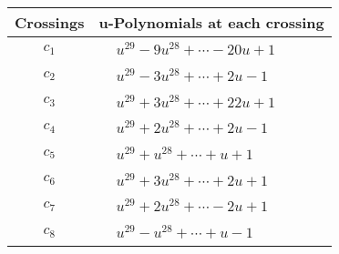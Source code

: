 \documentclass[1p]{elsarticle_modified}
\theoremstyle{definition}
\begin{document}
\begin{tabular}{m{50pt}|m{274pt}}
Crossings & \hspace{64pt}u-Polynomials at each crossing \\
\hline $$\begin{aligned}c_{1}\end{aligned}$$&$\begin{aligned}
&u^{29}-9 u^{28}+\cdots-20 u+1
\end{aligned}$\\
\hline $$\begin{aligned}c_{2}\end{aligned}$$&$\begin{aligned}
&u^{29}-3 u^{28}+\cdots+2 u-1
\end{aligned}$\\
\hline $$\begin{aligned}c_{3}\end{aligned}$$&$\begin{aligned}
&u^{29}+3 u^{28}+\cdots+22 u+1
\end{aligned}$\\
\hline $$\begin{aligned}c_{4}\end{aligned}$$&$\begin{aligned}
&u^{29}+2 u^{28}+\cdots+2 u-1
\end{aligned}$\\
\hline $$\begin{aligned}c_{5}\end{aligned}$$&$\begin{aligned}
&u^{29}+u^{28}+\cdots+u+1
\end{aligned}$\\
\hline $$\begin{aligned}c_{6}\end{aligned}$$&$\begin{aligned}
&u^{29}+3 u^{28}+\cdots+2 u+1
\end{aligned}$\\
\hline $$\begin{aligned}c_{7}\end{aligned}$$&$\begin{aligned}
&u^{29}+2 u^{28}+\cdots-2 u+1
\end{aligned}$\\
\hline $$\begin{aligned}c_{8}\end{aligned}$$&$\begin{aligned}
&u^{29}- u^{28}+\cdots+u-1
\end{aligned}$\\

\end{tabular}
\end{document}
